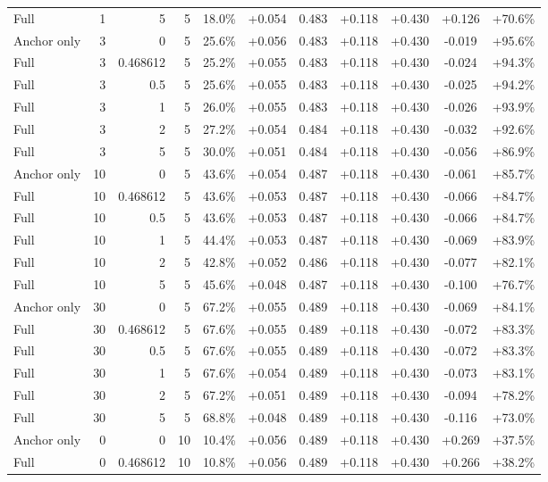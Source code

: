 \begin{table}[htbp]
\begin{tabular}{lrrrccccccc}
Full & 1 & 5 & 5 & 18.0\% & +0.054 & 0.483 & +0.118 & +0.430 & +0.126 & +70.6\% \\
Anchor only & 3 & 0 & 5 & 25.6\% & +0.056 & 0.483 & +0.118 & +0.430 & -0.019 & +95.6\% \\
Full & 3 & 0.468612 & 5 & 25.2\% & +0.055 & 0.483 & +0.118 & +0.430 & -0.024 & +94.3\% \\
Full & 3 & 0.5 & 5 & 25.6\% & +0.055 & 0.483 & +0.118 & +0.430 & -0.025 & +94.2\% \\
Full & 3 & 1 & 5 & 26.0\% & +0.055 & 0.483 & +0.118 & +0.430 & -0.026 & +93.9\% \\
Full & 3 & 2 & 5 & 27.2\% & +0.054 & 0.484 & +0.118 & +0.430 & -0.032 & +92.6\% \\
Full & 3 & 5 & 5 & 30.0\% & +0.051 & 0.484 & +0.118 & +0.430 & -0.056 & +86.9\% \\
Anchor only & 10 & 0 & 5 & 43.6\% & +0.054 & 0.487 & +0.118 & +0.430 & -0.061 & +85.7\% \\
Full & 10 & 0.468612 & 5 & 43.6\% & +0.053 & 0.487 & +0.118 & +0.430 & -0.066 & +84.7\% \\
Full & 10 & 0.5 & 5 & 43.6\% & +0.053 & 0.487 & +0.118 & +0.430 & -0.066 & +84.7\% \\
Full & 10 & 1 & 5 & 44.4\% & +0.053 & 0.487 & +0.118 & +0.430 & -0.069 & +83.9\% \\
Full & 10 & 2 & 5 & 42.8\% & +0.052 & 0.486 & +0.118 & +0.430 & -0.077 & +82.1\% \\
Full & 10 & 5 & 5 & 45.6\% & +0.048 & 0.487 & +0.118 & +0.430 & -0.100 & +76.7\% \\
Anchor only & 30 & 0 & 5 & 67.2\% & +0.055 & 0.489 & +0.118 & +0.430 & -0.069 & +84.1\% \\
Full & 30 & 0.468612 & 5 & 67.6\% & +0.055 & 0.489 & +0.118 & +0.430 & -0.072 & +83.3\% \\
Full & 30 & 0.5 & 5 & 67.6\% & +0.055 & 0.489 & +0.118 & +0.430 & -0.072 & +83.3\% \\
Full & 30 & 1 & 5 & 67.6\% & +0.054 & 0.489 & +0.118 & +0.430 & -0.073 & +83.1\% \\
Full & 30 & 2 & 5 & 67.2\% & +0.051 & 0.489 & +0.118 & +0.430 & -0.094 & +78.2\% \\
Full & 30 & 5 & 5 & 68.8\% & +0.048 & 0.489 & +0.118 & +0.430 & -0.116 & +73.0\% \\
Anchor only & 0 & 0 & 10 & 10.4\% & +0.056 & 0.489 & +0.118 & +0.430 & +0.269 & +37.5\% \\
Full & 0 & 0.468612 & 10 & 10.8\% & +0.056 & 0.489 & +0.118 & +0.430 & +0.266 & +38.2\% \\

\end{tabular}
\end{table}
